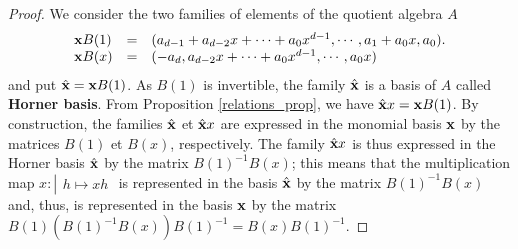 \documentclass{standalone}
\begin{document}
\begin{proof}
We consider the two families of elements of the quotient algebra $A$
\begin{equation}
	\begin{array}{lll}
		\bold{x}B(1) & = & (a_{d-1} + a_{d-2}x + \cdots + a_0x^{d-1}, \cdots, a_1 + a_0x,  a_0).\\
		\bold{x}B(x) & = & (-a_d, a_{d-2}x + \cdots + a_0x^{d-1}, \cdots, a_0x)
	\end{array}
\end{equation}
and put $\hat{\bold{x}} = \bold{x}B(1)$.
As $B(1)$ is invertible, the family $\hat{\bold{x}}$ is a basis of $A$ called {\bf Horner basis}.
From Proposition \ref{relations_prop}, we have $\hat{\bold{x}}x = \bold{x}B(1)$. By construction, the families $\hat{\bold{x}}$ et $\hat{\bold{x}}x$ are expressed in the monomial basis $\bold{x}$ by the matrices $B(1)$ et $B(x)$, respectively.
The family $\hat{\bold{x}}x$ is thus expressed in the Horner basis $\hat{\bold{x}}$ by the matrix $B(1)^{-1}B(x)$; this means that the multiplication map
$x : \left\vert
\begin{array}{c}
h \mapsto xh
\end{array}
\right.$ is represented in the basis $\hat{\bold{x}}$ by the matrix $B(1)^{-1}B(x)$
and, thus, is represented in the basis $\bold{x}$ by the matrix $B(1)(B(1)^{-1}B(x))B(1)^{-1} = B(x)B(1)^{-1}$.
\end{proof}
\end{document}
